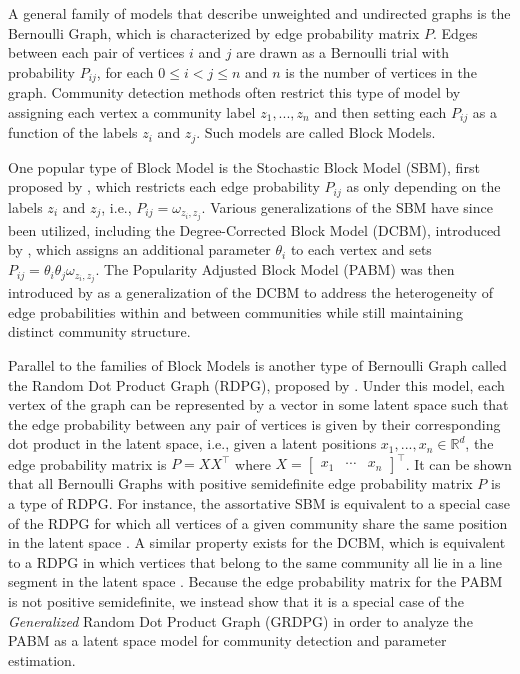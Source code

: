\documentclass[12pt]{article}
\begin{document}
A general family of models that describe unweighted and undirected graphs is 
the Bernoulli Graph, which is characterized by edge probability matrix $P$. 
Edges between each pair of vertices $i$ and $j$ are drawn 
as a Bernoulli trial with probability $P_{ij}$, for each 
$0 \leq i < j \leq n$ and $n$ is the number of vertices in the graph. 
Community detection methods often restrict this type of model 
by assigning each vertex a community label $z_1, ..., z_n$ 
and then setting each $P_{ij}$ as a function of the labels $z_i$ and $z_j$. 
Such models are called Block Models. 

One popular type of Block Model is the Stochastic Block Model (SBM),
first proposed by \citet{doi:10.1080/0022250X.1971.9989788}, 
which restricts each edge probability $P_{ij}$ as only depending on the labels 
$z_i$ and $z_j$, i.e., $P_{ij} = \omega_{z_i, z_j}$. 
Various generalizations of the SBM have since been utilized, 
including the Degree-Corrected Block Model (DCBM), 
introduced by \citet{Karrer_2011}, 
which assigns an additional parameter $\theta_i$ to each vertex 
and sets $P_{ij} = \theta_i \theta_j \omega_{z_i, z_j}$. 
The Popularity Adjusted Block Model (PABM) was then introduced by
\citet*{307cbeb9b1be48299388437423d94bf1} as a generalization of the
DCBM to address the heterogeneity of edge probabilities within and
between communities while still maintaining distinct community
structure.

Parallel to the families of Block Models is another type of Bernoulli Graph 
called the Random Dot Product Graph (RDPG), proposed by
\citet*{10.1007/978-3-540-77004-6_11}. 
Under this model, each vertex of the graph
can be represented by a vector in some latent space such that the edge
probability between any pair of vertices is given by their corresponding
dot product in the latent space, i.e., given a latent positions
\(x_1, ..., x_n \in \mathbb{R}^d\), the edge probability matrix is
\(P = X X^\top\) where 
\(X = \begin{bmatrix} x_1 & \cdots & x_n \end{bmatrix}^\top\). 
It can be shown that all Bernoulli Graphs with 
positive semidefinite edge probability matrix $P$ is a type of RDPG. 
For instance, the assortative
SBM is equivalent to a special case of the RDPG for which all vertices
of a given community share the same position in the latent space
\cite{lyzinski2014}. A similar property exists for the DCBM, 
which is equivalent to a RDPG in which vertices that belong to the same 
community all lie in a line segment in the latent space 
\cite{lyzinski2014, rubindelanchy2017consistency}. 
Because the edge probability matrix for the PABM is not positive semidefinite, 
we instead show that it is a special case of the 
\emph{Generalized} Random Dot Product Graph (GRDPG) 
in order to analyze the PABM as a latent space model 
for community detection and parameter estimation. 
\end{document}
